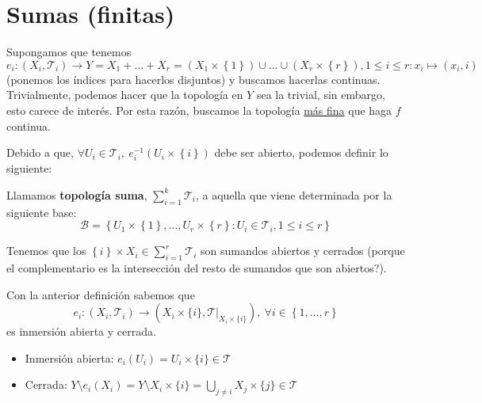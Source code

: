 \section{Sumas (finitas)}%
\label{sec:sumas_finitas}
Supongamos que tenemos $e_i: \left( X_i, \mathcal{T}_i \right) \rightarrow Y = X_1 + \ldots + X_r = \left( X_1 \times \left\{ 1 \right\} \right) \cup \ldots \cup \left( X_r \times \left\{ r \right\} \right), 1 \le i \le r: x_i \mapsto \left( x_i, i \right)$ (ponemos los índices para hacerlos disjuntos) y buscamos hacerlas continuas. Trivialmente, podemos hacer que la topología en $Y$ sea la trivial, sin embargo, esto carece de interés. Por esta razón, buscamos la topología \underline{más fina} que haga $f$ continua.

Debido a que, $\forall U_i \in \mathcal{T}_i,\ e_i^{-1}\left( U_i \times \left\{ i \right\} \right)$ debe ser abierto, podemos definir lo siguiente:
\begin{defi}
Llamamos \textbf{topología suma}, $\sum_{i=1}^{k} \mathcal{T}_i$, a aquella que viene determinada por la siguiente base:
\[
\mathcal{B} = \left\{ U_1 \times \left\{ 1 \right\}, \ldots, U_r \times \left\{ r \right\}: U_i \in \mathcal{T}_i, 1 \le i \le r \right\}
\]
\end{defi}

\begin{obs}
Tenemos que los $\left\{ i \right\} \times X_i \in \sum_{i=1}^{r} \mathcal{T}_i$ son sumandos abiertos y cerrados (porque el complementario es la intersección del resto de sumandos que son abiertos?).
\end{obs}

\begin{prop}
Con la anterior definición sabemos que 
\[
e_i: \left( X_i, \mathcal{T}_i \right) \rightarrow \left( X_i\times \{i\}, \mathcal{T}|_{X_i \times \{i\}} \right),\ \forall i \in \left\{ 1, \ldots, r \right\}
\]
es inmersión abierta y cerrada.
\end{prop}
\begin{demo}
\begin{itemize}
    \item Inmersión abierta: $e_i\left( U_i \right) = U_i \times \{i\} \in \mathcal{T}$
    \item Cerrada: $Y\setminus e_i\left( X_i \right) = Y \setminus X_i \times \{i\} = \bigcup_{j \neq i} X_j \times \{j\} \in \mathcal{T}$
\end{itemize}
\end{demo}

